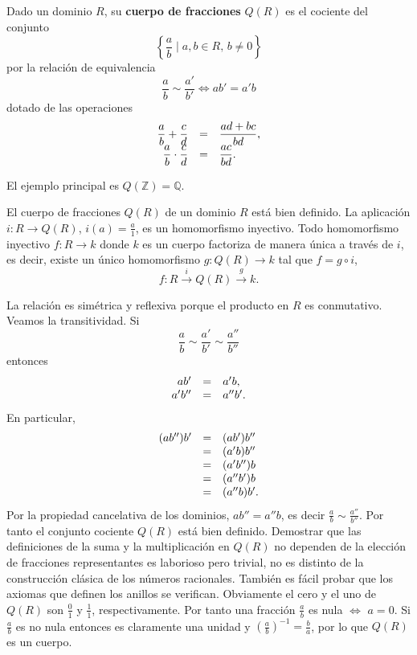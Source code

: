 
Dado un dominio \(R\), su \textbf{cuerpo de fracciones} \(Q( R )\) es el
cociente del conjunto
\[\left\{\frac{a}{b}\;\bigg|\; a,b\in R,\,b\neq 0\right\}\] por la
relación de equivalencia
\[\frac{a}{b}\sim\frac{a'}{b'}\Leftrightarrow ab'=a'b\] dotado de las
operaciones
\[\begin{array}{rcl}\displaystyle \frac{a}{b}+\frac{c}{d}&\displaystyle =&\displaystyle  \frac{ad+bc}{bd},\cr\displaystyle \frac{a}{b}\cdot\frac{c}{d}&\displaystyle =&\displaystyle \frac{a c}{b d}.\end{array}\]

El ejemplo principal es \(Q(\mathbb Z)=\mathbb Q\).


El cuerpo de fracciones \(Q( R )\) de un dominio \(R\) está bien
definido. La aplicación \(i\colon R\rightarrow Q( R )\),
\(i(a)=\frac{a}{1}\), es un homomorfismo inyectivo. Todo homomorfismo
inyectivo \(f\colon R\rightarrow k\) donde \(k\) es un cuerpo factoriza
de manera única a través de \(i\), es decir, existe un único
homomorfismo \(g\colon Q( R )\rightarrow k\) tal que \(f=g\circ i\),
\[f\colon R\stackrel{i}\rightarrow Q( R )\stackrel{g}\rightarrow k.\]


La relación es simétrica y reflexiva porque el producto en \(R\) es
conmutativo. Veamos la transitividad. Si
\[\displaystyle \frac{a}{b}\sim \frac{a'}{b'}\sim \frac{a''}{b''}\]
entonces \[\begin{array}{rcl}
ab'&=&a'b,\cr 
a'b''&=&a'' b'.
\end{array}\] En particular, \[\begin{array}{rcl}
(a b'') b'&=&(ab')b''\cr
&=&(a'b)b''\cr
&=&(a'b'')b\cr
&=&(a'' b')b\cr
&=&(a'' b)b'.
\end{array}\] Por la propiedad cancelativa de los dominios,
\(ab''=a'' b\), es decir \(\frac{a}{b}\sim \frac{a''}{b''}\). Por tanto
el conjunto cociente \(Q( R )\) está bien definido. Demostrar que las
definiciones de la suma y la multiplicación en \(Q(R)\) no dependen de
la elección de fracciones representantes es laborioso pero trivial, no
es distinto de la construcción clásica de los números racionales.
También es fácil probar que los axiomas que definen los anillos se
verifican. Obviamente el cero y el uno de \(Q( R )\) son \(\frac{0}{1}\)
y \(\frac{1}{1}\), respectivamente. Por tanto una fracción
\(\frac{a}{b}\) es nula \(\Leftrightarrow\) \(a=0\). Si \(\frac{a}{b}\)
es no nula entonces es claramente una unidad y
\((\frac{a}{b})^{-1}=\frac{b}{a}\), por lo que \(Q( R )\) es un cuerpo.

